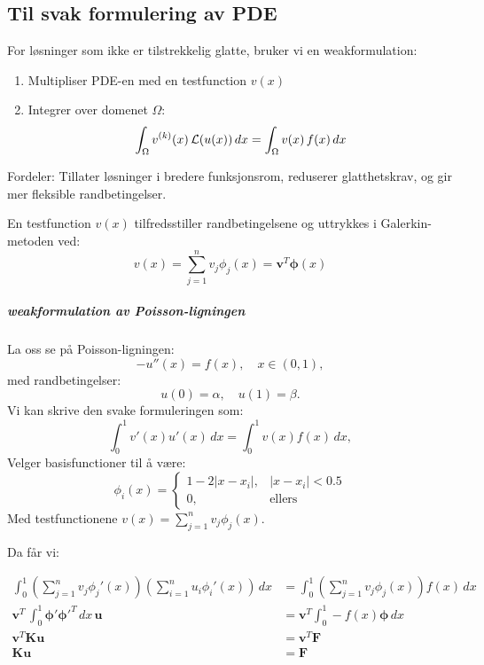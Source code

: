 \subsection{Til svak formulering av PDE}
For løsninger som ikke er tilstrekkelig glatte, bruker vi en \gls{weakformulation}:

\begin{enumerate}
  \item Multipliser PDE-en med en \gls{testfunction} $v(x)$
  \item Integrer over domenet $\Omega$:
  \[
    \int_\Omega v^{(k)}(x) \, \mathcal{L}(u(x)) \, dx = \int_\Omega v(x) \, f(x) \, dx
  \]
\end{enumerate}

Fordeler: Tillater løsninger i bredere funksjonsrom, reduserer glatthetskrav, og gir mer fleksible randbetingelser.

En \gls{testfunction} $v(x)$ tilfredsstiller randbetingelsene og uttrykkes i Galerkin-metoden ved:
\[
  v(x) = \sum_{j=1}^n v_j \phi_j(x) = \symbf{v}^T \symbf{\phi}(x)
\]


\subparagraph{\gls{weakformulation} av Poisson-ligningen}
La oss se på Poisson-ligningen:
\[
  -u''(x) = f(x), \quad x \in (0,1),
\]
med randbetingelser:
\[
  u(0) = \alpha, \quad u(1) = \beta.
\]
Vi kan skrive den svake formuleringen som:
\[
  \int_0^1 v'(x) u'(x) \, dx = \int_0^1 v(x) f(x) \, dx,
\]
Velger \gls{basisfunction}er til å være:
\[
  \phi_i(x) = \begin{cases}
    1 - 2|x - x_i|, & |x - x_i| < 0.5 \\
    0,              & \text{ellers}
  \end{cases}
\]
Med \gls{testfunction}ene \(v(x) = \sum_{j=1}^n v_j \phi_j(x)\).

Da får vi:

\begin{align*}
  \int_0^1 \left( \sum_{j=1}^n v_j \phi_j'(x) \right) \left( \sum_{i=1}^n u_i \phi_i'(x) \right) \, dx
                      & =
  \int_0^1 \left( \sum_{j=1}^n v_j \phi_j(x) \right) f(x) \, dx \\
  \symbf{v}^T \, \int_0^1 \symbf{\phi}' \symbf{\phi}'^T \, dx \, \symbf{u}
                      & =
  \symbf{v}^T \int_0^1 - f(x) \symbf{\phi}  \, dx               \\
  \symbf{v}^T \symbf{K} \symbf{u}
                      & =
  \symbf{v}^T \symbf{F}                                         \\
  \symbf{K} \symbf{u} & = \symbf{F}
\end{align*}


